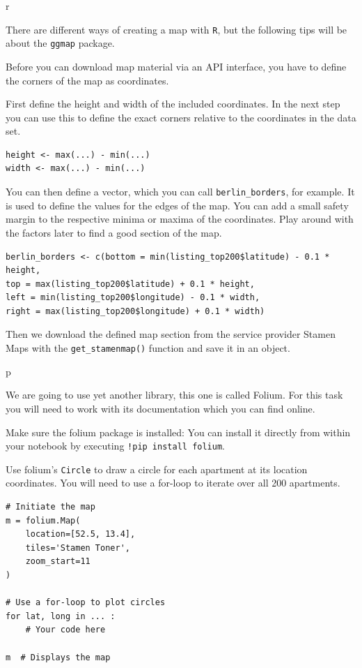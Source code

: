 \documentclass[
  11pt,
]{book}
\begin{document}
\begin{tips}r

There are different ways of creating a map with \texttt{R}, but the
following tips will be about the \texttt{ggmap} package.

Before you can download map material via an API interface, you have to
define the corners of the map as coordinates.

First define the height and width of the included coordinates. In the
next step you can use this to define the exact corners relative to the
coordinates in the data set.

\begin{verbatim}
height <- max(...) - min(...)
width <- max(...) - min(...)
\end{verbatim}

You can then define a vector, which you can call
\texttt{berlin\_borders}, for example. It is used to define the values
for the edges of the map. You can add a small safety margin to the
respective minima or maxima of the coordinates. Play around with the
factors later to find a good section of the map.

\begin{verbatim}
berlin_borders <- c(bottom = min(listing_top200$latitude) - 0.1 * height,
top = max(listing_top200$latitude) + 0.1 * height,
left = min(listing_top200$longitude) - 0.1 * width,
right = max(listing_top200$longitude) + 0.1 * width)
\end{verbatim}

Then we download the defined map section from the service provider
Stamen Maps with the \texttt{get\_stamenmap()} function and save it in
an object.

\end{tips}

\begin{tipsp}p

We are going to use yet another library, this one is called Folium. For
this task you will need to work with its documentation which you can
find online.

Make sure the folium package is installed: You can install it directly
from within your notebook by executing \texttt{!pip\ install\ folium}.

Use folium's \texttt{Circle} to draw a circle for each apartment at its
location coordinates. You will need to use a for-loop to iterate over
all 200 apartments.

\begin{verbatim}
# Initiate the map
m = folium.Map(
    location=[52.5, 13.4],
    tiles='Stamen Toner',
    zoom_start=11
)

# Use a for-loop to plot circles
for lat, long in ... :
    # Your code here

m  # Displays the map
\end{verbatim}

\end{tipsp}
\end{document}
